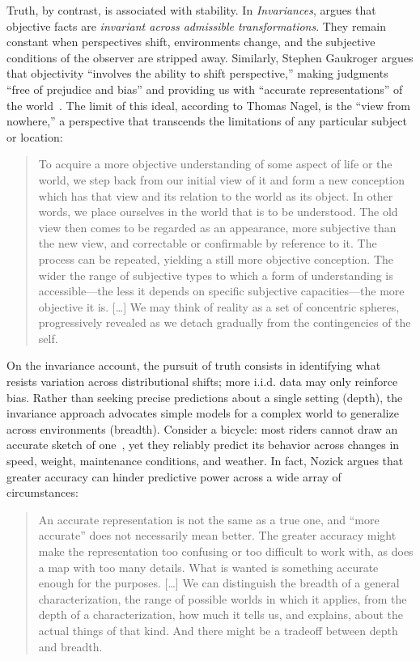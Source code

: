 Truth, by contrast, is associated with stability. In \emph{Invariances}, \citet{nozick2001} argues that objective facts are \emph{invariant across admissible transformations}. They remain constant when perspectives shift, environments change, and the subjective conditions of the observer are stripped away. Similarly, Stephen Gaukroger argues that objectivity ``involves the ability to shift perspective,'' making judgments ``free of prejudice and bias'' and providing us with ``accurate representations'' of the world~\citep{gaukroger2012}. The limit of this ideal, according to Thomas Nagel, is the ``view from nowhere,'' a perspective that transcends the limitations of any particular subject or location:
\begin{quote}
To acquire a more objective understanding of some aspect of life or the world, we step back from our initial view of it and form a new conception which has that view and its relation to the world as its object. In other words, we place ourselves in the world that is to be understood. The old view then comes to be regarded as an appearance, more subjective than the new view, and correctable or confirmable by reference to it. The process can be repeated, yielding a still more objective conception. The wider the range of subjective types to which a form of understanding is accessible---the less it depends on specific subjective capacities---the more objective it is. [\ldots] We may think of reality as a set of concentric spheres, progressively revealed as we detach gradually from the contingencies of the self. \citep[pp. 4--5]{nagel1986}
\end{quote}

On the invariance account, the pursuit of truth consists in identifying what resists variation across distributional shifts; more i.i.d. data may only reinforce bias. Rather than seeking precise predictions about a single setting (depth), the invariance approach advocates simple models for a complex world to generalize across environments (breadth). Consider a bicycle: most riders cannot draw an accurate sketch of one~\citep{lawson2006science}, yet they reliably predict its behavior across changes in speed, weight, maintenance conditions, and weather. In fact, Nozick argues that greater accuracy can hinder predictive power across a wide array of circumstances:

\begin{quote}
An accurate representation is not the same as a true one, and ``more accurate'' does not necessarily mean better. The greater accuracy might make the representation too confusing or too difficult to work with, as does a map with too many details. What is wanted is something accurate enough for the purposes. [\ldots] We can distinguish the breadth of a general characterization, the range of possible worlds in which it applies, from the depth of a characterization, how much it tells us, and explains, about the actual things of that kind. And there might be a tradeoff between depth and breadth. \citep[p. 67]{nozick2001}
\end{quote}

